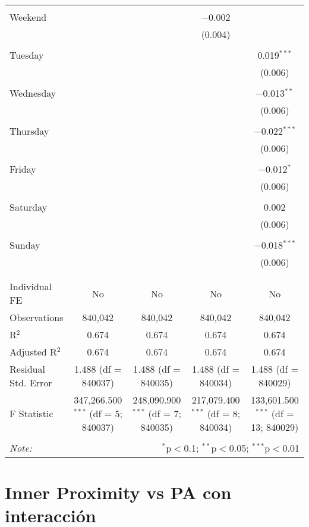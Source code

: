 \documentclass[
]{article}
\begin{document}
\begin{table}[!htbp]
{\begin{tabular}{@{\extracolsep{5pt}}lcccc}
  & & & & \\ 
 Weekend &  &  & $-$0.002 &  \\ 
  &  &  & (0.004) &  \\ 
  & & & & \\ 
 Tuesday &  &  &  & 0.019$^{***}$ \\ 
  &  &  &  & (0.006) \\ 
  & & & & \\ 
 Wednesday &  &  &  & $-$0.013$^{**}$ \\ 
  &  &  &  & (0.006) \\ 
  & & & & \\ 
 Thursday &  &  &  & $-$0.022$^{***}$ \\ 
  &  &  &  & (0.006) \\ 
  & & & & \\ 
 Friday &  &  &  & $-$0.012$^{*}$ \\ 
  &  &  &  & (0.006) \\ 
  & & & & \\ 
 Saturday &  &  &  & 0.002 \\ 
  &  &  &  & (0.006) \\ 
  & & & & \\ 
 Sunday &  &  &  & $-$0.018$^{***}$ \\ 
  &  &  &  & (0.006) \\ 
  & & & & \\ 
\hline \\[-1.8ex] 
Individual FE & No & No & No & No \\ 
Observations & 840,042 & 840,042 & 840,042 & 840,042 \\ 
R$^{2}$ & 0.674 & 0.674 & 0.674 & 0.674 \\ 
Adjusted R$^{2}$ & 0.674 & 0.674 & 0.674 & 0.674 \\ 
Residual Std. Error & 1.488 (df = 840037) & 1.488 (df = 840035) & 1.488 (df = 840034) & 1.488 (df = 840029) \\ 
F Statistic & 347,266.500$^{***}$ (df = 5; 840037) & 248,090.900$^{***}$ (df = 7; 840035) & 217,079.400$^{***}$ (df = 8; 840034) & 133,601.500$^{***}$ (df = 13; 840029) \\ 
\hline 
\hline \\[-1.8ex] 
\textit{Note:}  & \multicolumn{4}{r}{$^{*}$p$<$0.1; $^{**}$p$<$0.05; $^{***}$p$<$0.01} \\ 
\end{tabular}
} 
\end{table} 
\newpage
\section{Inner Proximity vs PA con interacción}
\end{document}
